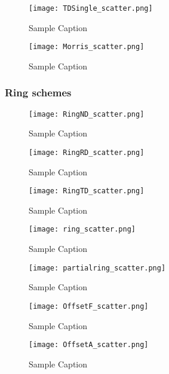 \documentclass{article}
\begin{document}
\begin{figure}[ht]
    \centering
    \texttt{[image: TDSingle\_scatter.png]}
    \caption{Sample Caption}
\end{figure}




\begin{figure}[ht]
    \centering
    \texttt{[image: Morris\_scatter.png]}
    \caption{Sample Caption}
\end{figure}


\subsubsection{Ring schemes}
\begin{figure}[ht]
    \centering
    \texttt{[image: RingND\_scatter.png]}
    \caption{Sample Caption}
\end{figure}

\begin{figure}[ht]
    \centering
    \texttt{[image: RingRD\_scatter.png]}
    \caption{Sample Caption}
\end{figure}

\begin{figure}[ht]
    \centering
    \texttt{[image: RingTD\_scatter.png]}
    \caption{Sample Caption}
\end{figure}





\begin{figure}[ht]
    \centering
    \texttt{[image: ring\_scatter.png]}
    \caption{Sample Caption}
\end{figure}

\begin{figure}[ht]
    \centering
    \texttt{[image: partialring\_scatter.png]}
    \caption{Sample Caption}
\end{figure}


\begin{figure}[ht]
    \centering
    \texttt{[image: OffsetF\_scatter.png]}
    \caption{Sample Caption}
\end{figure}

\begin{figure}[ht]
    \centering
    \texttt{[image: OffsetA\_scatter.png]}
    \caption{Sample Caption}
\end{figure}
\end{document}
